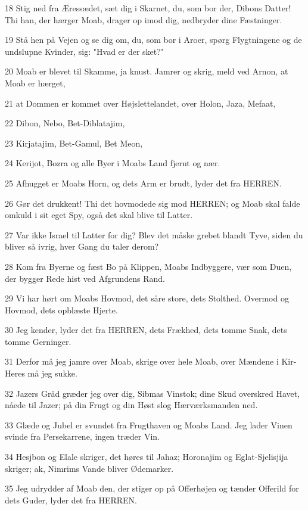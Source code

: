 \par 18 Stig ned fra Æressædet, sæt dig i Skarnet, du, som bor der, Dibons Datter! Thi han, der hærger Moab, drager op imod dig, nedbryder dine Fæstninger.
\par 19 Stå hen på Vejen og se dig om, du, som bor i Aroer, spørg Flygtningene og de undslupne Kvinder, sig: "Hvad er der sket?"
\par 20 Moab er blevet til Skamme, ja knust. Jamrer og skrig, meld ved Arnon, at Moab er hærget,
\par 21 at Dommen er kommet over Højslettelandet, over Holon, Jaza, Mefaat,
\par 22 Dibon, Nebo, Bet-Diblatajim,
\par 23 Kirjatajim, Bet-Gamul, Bet Meon,
\par 24 Kerijot, Bozra og alle Byer i Moabs Land fjernt og nær.
\par 25 Afhugget er Moabs Horn, og dets Arm er brudt, lyder det fra HERREN.
\par 26 Gør det drukkent! Thi det hovmodede sig mod HERREN; og Moab skal falde omkuld i sit eget Spy, også det skal blive til Latter.
\par 27 Var ikke Israel til Latter for dig? Blev det måske grebet blandt Tyve, siden du bliver så ivrig, hver Gang du taler derom?
\par 28 Kom fra Byerne og fæst Bo på Klippen, Moabs Indbyggere, vær som Duen, der bygger Rede hist ved Afgrundens Rand.
\par 29 Vi har hørt om Moabs Hovmod, det såre store, dets Stolthed. Overmod og Hovmod, dets opblæste Hjerte.
\par 30 Jeg kender, lyder det fra HERREN, dets Frækhed, dets tomme Snak, dets tomme Gerninger.
\par 31 Derfor må jeg jamre over Moab, skrige over hele Moab, over Mændene i Kir-Heres må jeg sukke.
\par 32 Jazers Gråd græder jeg over dig, Sibmas Vinstok; dine Skud overskred Havet, nåede til Jazer; på din Frugt og din Høst slog Hærværksmanden ned.
\par 33 Glæde og Jubel er svundet fra Frugthaven og Moabs Land. Jeg lader Vinen svinde fra Persekarrene, ingen træder Vin.
\par 34 Hesjbon og Elale skriger, det høres til Jahaz; Horonajim og Eglat-Sjelisjija skriger; ak, Nimrims Vande bliver Ødemarker.
\par 35 Jeg udrydder af Moab den, der stiger op på Offerhøjen og tænder Offerild for dets Guder, lyder det fra HERREN.

